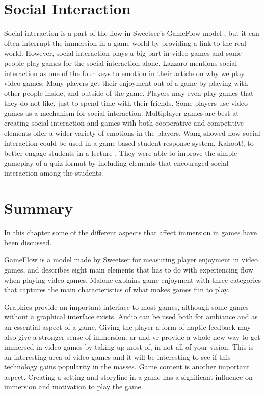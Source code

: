 \section{Social Interaction}
Social interaction is a part of the flow in Sweetser's GameFlow model \cite{sweetser2005gameflow}, but it can often interrupt the immersion in a game world by providing a link to the real world. However, social interaction plays a big part in video games and some people play games for the social interaction alone. Lazzaro \cite{lazzaro2004we} mentions social interaction as one of the four keys to emotion in their article on why we play video games. Many players get their enjoyment out of a game by playing with other people inside, and outside of the game. Players may even play games that they do not like, just to spend time with their friends. Some players use video games as a mechanism for social interaction. Multiplayer games are best at creating social interaction and games with both cooperative and competitive elements offer a wider variety of emotions in the players. Wang showed how social interaction could be used in a game based student response system, Kahoot!, to better engage students in a lecture \cite{wang2015wear}. They were able to improve the simple gameplay of a quiz format by including elements that encouraged social interaction among the students.


\section{Summary}
In this chapter some of the different aspects that affect immersion in games have been discussed.

GameFlow is a model made by Sweetser \cite{sweetser2005gameflow} for measuring player enjoyment in video games, and describes eight main elements that has to do with experiencing flow when playing video games. Malone \cite{malone1980makes} explains game enjoyment with three categories that captures the main characteristics of what makes games fun to play. 

Graphics provide an important interface to most games, although some games without a graphical interface exists.
Audio can be used both for ambiance and as an essential aspect of a game.
Giving the player a form of haptic feedback may also give a stronger sense of immersion. \gls{ar} and \gls{vr} provide a whole new way to get immersed in video games by taking up most of, in not all of your vision. This is an interesting area of video games and it will be interesting to see if this technology gains popularity in the masses. Game content is another important aspect. Creating a setting and storyline in a game has a significant influence on immersion and motivation to play the game.

